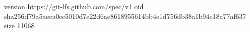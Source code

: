 version https://git-lfs.github.com/spec/v1
oid sha256:f79a5aeca0ec5010d7e22d6ae8618955614bb4e1d756db38a1b94e18a77af637
size 11068
